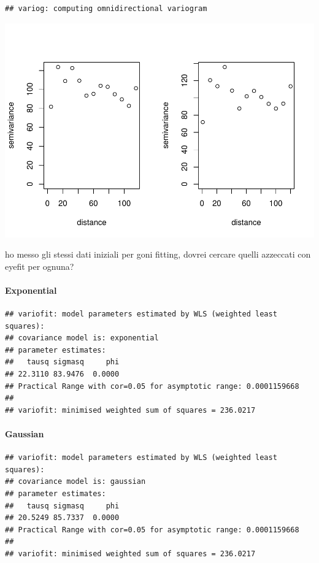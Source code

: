 \documentclass[
]{article}
\begin{document}
\begin{verbatim}
## variog: computing omnidirectional variogram
\end{verbatim}

\includegraphics{Assignment_1_files/figure-latex/unnamed-chunk-25-1.pdf}

ho messo gli stessi dati iniziali per goni fitting, dovrei cercare
quelli azzeccati con eyefit per ognuna?

\hypertarget{exponential}{%
\paragraph{Exponential}\label{exponential}}

\begin{verbatim}
## variofit: model parameters estimated by WLS (weighted least squares):
## covariance model is: exponential
## parameter estimates:
##   tausq sigmasq     phi 
## 22.3110 83.9476  0.0000 
## Practical Range with cor=0.05 for asymptotic range: 0.0001159668
## 
## variofit: minimised weighted sum of squares = 236.0217
\end{verbatim}

\hypertarget{gaussian}{%
\paragraph{Gaussian}\label{gaussian}}

\begin{verbatim}
## variofit: model parameters estimated by WLS (weighted least squares):
## covariance model is: gaussian
## parameter estimates:
##   tausq sigmasq     phi 
## 20.5249 85.7337  0.0000 
## Practical Range with cor=0.05 for asymptotic range: 0.0001159668
## 
## variofit: minimised weighted sum of squares = 236.0217
\end{verbatim}
\end{document}
